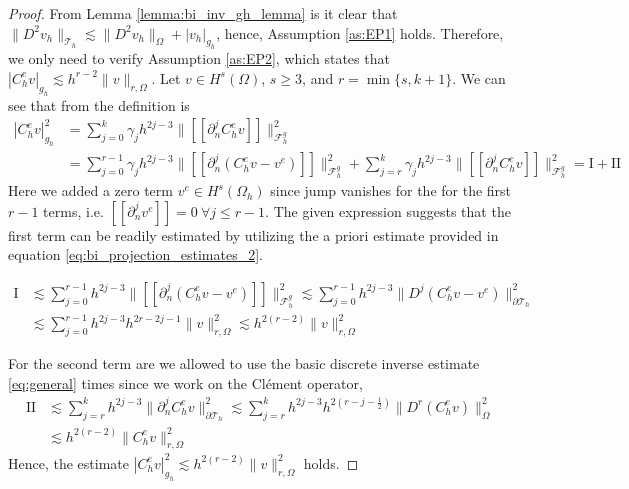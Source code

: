 \documentclass[11pt]{article}
\theoremstyle{remark}
\newcommand{\jump}[1]{\left[\!\left[ #1 \right]\!\right]}
\newcommand{\abs}[1]{\left\lvert #1 \right\rvert}
\renewcommand{\le}{\leqslant}
\renewcommand{\ge}{\geqslant}
\numberwithin{equation}{section}
\begin{document}
\begin{proof}
  From Lemma \ref{lemma:bi_inv_gh_lemma} is it clear that $
    \| D^2v_{h} \|_{ \mathcal{T} _{h} }^{  }  \lesssim \| D^2 v_{h} \|_{ \Omega   }^{  } + \abs{ v_{h} } _{g_{h}}
    $, hence, Assumption \ref{as:EP1} holds.
    Therefore, we only need to verify Assumption \ref{as:EP2}, which states that $ \abs{ C^{e}_{h} v }_{g_{h}} \lesssim h^{r-2} \| v \|_{r, \Omega   }^{  }$.
    Let $v  \in H^{s}( \Omega ) $, $s\ge 3$,  and $r = \min\{s,k+1\} $. We can see that from the definition is
    \begin{equation}
        \label{eq:est_gh:1}
        \begin{split}
        \abs{ C^{e}_{h} v }_{g_{h}}^{2} & = \sum_{j=0}^{k}  \gamma _{j} h^{2j-3}  \| \jump{ \partial ^{j}_{n} C^{e}_{h} v }  \|_{\mathcal{F}_{h}^{g} }^{2} \\
                                        & = \sum_{j=0}^{r-1}  \gamma _{j} h^{2j-3}   \| \jump{ \partial ^{j}_{n}  ( C^{e}_{h} v- v^{e} )  }  \|_{\mathcal{F}_{h}^{g} }^{2} + \sum_{j=r}^{k}  \gamma _{j} h^{2j-3}  \| \jump{ \partial ^{j}_{n} C^{e}_{h} v }
                                        \|_{\mathcal{F}_{h}^{g} }^{2} = \mathrm{I} + \mathrm{II}
        \end{split}
    \end{equation}
    Here we added a zero term $v^{e} \in H^{s}( \Omega_{h} ) $  since jump vanishes for the for the first $r-1$ terms, i.e. $\jump{ \partial ^{j}_{n} v^{e} } = 0  \  \forall j \le r-1$. The given expression suggests that the first term can be readily estimated by utilizing the a priori estimate provided in equation \eqref{eq:bi_projection_estimates_2}.

    \begin{equation}
        \begin{split}
        \mathrm{I}  & \lesssim \sum_{j=0}^{r-1} h^{2j-3}   \| \jump{ \partial ^{j}_{n}  ( C^{e}_{h} v - v^{e})   }  \|_{\mathcal{F}_{h}^{g} }^{2} \lesssim \sum_{j=0}^{r-1} h^{2j-3}   \| D ^{j}  ( C^{e}_{h} v - v^{e})     \|_{\partial \mathcal{T}_{h}  }^{2} \\
        & \lesssim \sum_{j=0}^{r-1} h^{2j-3}  h^{2r - 2j - 1}\| v  \|_{r,\Omega  }^{2} \lesssim     h^{2( r  - 2 )}\| v  \|_{r,\Omega  }^{2}
        \end{split}
    \end{equation}

     For the second term are we allowed to use the basic discrete inverse
    estimate \eqref{eq:general} times since we work on the Clément operator,
    \begin{equation}
        \begin{split}
       \mathrm{II}  & \lesssim \sum_{j=r}^{k} h^{2j-3}  \|  \partial ^{j}_{n} C^{e}_{h} v \|_{\partial \mathcal{T}_{h} }^{2} \lesssim \sum_{j=r}^{k} h^{2j-3} h^{2( r-j -\frac{1}{2}) }  \|  D^r ( C^{e}_{h} v ) \|_{ \Omega  }^{2}  \\
       &  \lesssim h^{2( r-2) } \| C^{e}_{h}v \|_{r,\Omega}^{2}
        \end{split}
    \end{equation}
    Hence, the estimate $\abs{ C^{e}_{h} v }_{g_{h}}^{2} \lesssim h^{2( r -2 )}\| v \|_{r, \Omega   }^{2}$ holds.


\end{proof}
\end{document}
